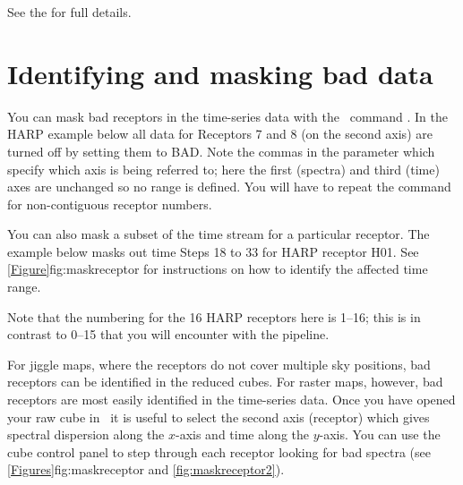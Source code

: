 \documentclass[11pt,oneside,chapters]{starlink}
\begin{document}
See the  for full
details.

\section{Identifying and masking bad data}
\label{sec:badrecs}

You can mask bad receptors in the time-series data with the \Kappa\
command \chpix. In the HARP example below all data for Receptors 7 and 8
(on the second axis) are turned off by setting them to BAD. Note the
commas in the \param{SECTION} parameter which specify which axis is
being referred to; here the first (spectra) and third (time) axes are
unchanged so no range is defined. You will have to repeat the command
for non-contiguous receptor numbers.

\begin{terminalv}
\end{terminalv}
You can also mask a subset of the time stream for a particular
receptor. The example below masks out time Steps 18 to 33 for HARP receptor
H01. See \cref{Figure}{fig:maskreceptor}{} for instructions on how to
identify the affected time range.
\begin{terminalv}
\end{terminalv}
Note that the numbering for the 16 HARP receptors here is 1--16; this is in
contrast to 0--15 that you will encounter with the pipeline.

For jiggle maps, where the receptors do not cover multiple sky
positions, bad receptors can be identified in the reduced cubes. For
raster maps, however, bad receptors are most easily identified in the
time-series data. Once you have opened your raw cube in \gaia\ it is
useful to select the second axis (receptor) which gives spectral
dispersion along the $x$-axis and time along the $y$-axis. You can use
the cube control panel to step through each receptor looking for bad
spectra (see \cref{Figures}{fig:maskreceptor}{} and
\ref{fig:maskreceptor2}).
\end{document}
